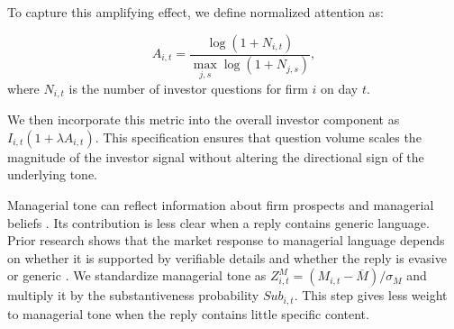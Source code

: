 \documentclass[12pt]{article}
\begin{document}
To capture this amplifying effect, we define normalized attention as:

\begin{equation}
A_{i,t}=\frac{\log(1+N_{i,t})}{\max_{j,s}\log(1+N_{j,s})},
\end{equation}
\noindent where $N_{i,t}$ is the number of investor questions for firm $i$ on day $t$. 

We then incorporate this metric into the overall investor component as $I_{i,t}(1+\lambda A_{i,t})$. This specification ensures that question volume scales the magnitude of the investor signal without altering the directional sign of the underlying tone.

Managerial tone can reflect information about firm prospects and managerial beliefs \citep{jiang2019}. Its contribution is less clear when a reply contains generic language. Prior research shows that the market response to managerial language depends on whether it is supported by verifiable details and whether the reply is evasive or generic \citep{boustanifar2025,hutton2003,xie2023}. We standardize managerial tone as $Z^M_{i,t}=(M_{i,t}-\overline{M})/\sigma_M$ and multiply it by the substantiveness probability $Sub_{i,t}$. This step gives less weight to managerial tone when the reply contains little specific content.
\end{document}
